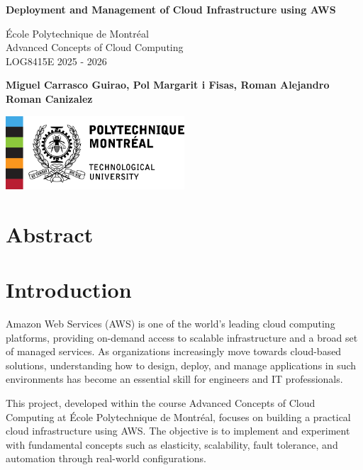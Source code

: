 \documentclass[a4paper,12pt]{article}
\begin{document}
	\begin{titlepage}
		\centering
		\vspace*{\fill}
		{\Huge \textbf{Deployment and Management of Cloud Infrastructure using AWS} \par} 
		\vspace{1.5cm}
		{\Large École Polytechnique de Montréal} \\
		[0.5cm]{\Large Advanced Concepts of Cloud Computing} \\ [0.5cm]
		{\Large LOG8415E}
		{\Large 2025 - 2026}  \\
		\vspace{1.5cm}
		{\Large \textbf{Miguel Carrasco Guirao, Pol Margarit i Fisas, Roman Alejandro Roman Canizalez} \par}
		\vspace{2cm}
		\includegraphics[width=0.5\textwidth]{logo_polytecnique.png}
		\vspace*{\fill}
		\vspace{1cm}
		\date{}
	\end{titlepage}
	
	\tableofcontents
	\newpage
	
	
	\section{Abstract}
	\section{Introduction}
	Amazon Web Services (AWS) is one of the world’s leading cloud computing platforms, providing on-demand access to scalable infrastructure and a broad set of managed services. As organizations increasingly move towards cloud-based solutions, understanding how to design, deploy, and manage applications in such environments has become an essential skill for engineers and IT professionals.
	
	This project, developed within the course Advanced Concepts of Cloud Computing at École Polytechnique de Montréal, focuses on building a practical cloud infrastructure using AWS. The objective is to implement and experiment with fundamental concepts such as elasticity, scalability, fault tolerance, and automation through real-world configurations.
	
\end{document}
